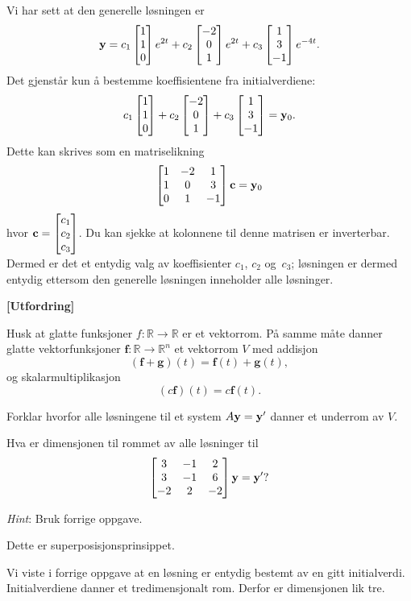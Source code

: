 \begin{losning}
Vi har sett at den generelle løsningen er 
$$\mathbf{y}=c_1\begin{bmatrix} 1 \\ 1 \\ 0 \end{bmatrix}e^{2t}+c_2\begin{bmatrix} -2 \\ 0 \\ 1 \end{bmatrix}e^{2t}+c_3\begin{bmatrix} 1 \\ 3 \\ -1 \end{bmatrix}e^{-4t}.$$ Det gjenstår kun å bestemme koeffisientene fra initialverdiene:
$$c_1\begin{bmatrix} 1 \\ 1 \\ 0 \end{bmatrix}+c_2\begin{bmatrix} -2 \\ 0 \\ 1 \end{bmatrix}+c_3\begin{bmatrix} 1 \\ 3 \\ -1 \end{bmatrix}=\mathbf{y}_0.$$ Dette kan skrives som en matriselikning
$$\begin{bmatrix}
1 & -2 & 1\\
1 & 0 & 3\\
0 & 1 & -1
\end{bmatrix} \mathbf{c}= \mathbf{y}_0$$ hvor $\mathbf{c}=\begin{bmatrix} c_1 \\ c_2 \\ c_3 \end{bmatrix}$. Du kan sjekke at kolonnene til denne matrisen er inverterbar. Dermed er det et entydig valg av koeffisienter $c_1$, $c_2$ og~$c_3$; løsningen er dermed entydig ettersom den generelle løsningen inneholder alle løsninger.
\end{losning}

\newpage
\begin{oppgave}\textbf{[Utfordring]}
	
\noindent
Husk at glatte funksjoner $f :\mathbb{R}\rightarrow \mathbb{R}$ er et vektorrom. På samme måte danner glatte vektorfunksjoner $\mathbf f:\mathbb{R}\rightarrow \mathbb{R}^n$ et vektorrom $V$ med addisjon
$$(\mathbf f + \mathbf g)(t)=\mathbf{f}(t)+\mathbf{g}(t),$$ og skalarmultiplikasjon
$$(c \mathbf f )(t)=c\mathbf{f}(t).$$

\begin{punkt}
Forklar hvorfor alle løsningene til et system $A\mathbf{y}=\mathbf{y}'$ danner et underrom av $V$.
\end{punkt}

\begin{punkt}
Hva er dimensjonen til rommet av alle løsninger til $$
\begin{bmatrix}
3 & -1 & 2\\
3 & -1 & 6\\
-2 & 2 & -2
\end{bmatrix} \mathbf{y}= \mathbf{y} ' ?$$

\noindent
\emph{Hint}: Bruk forrige oppgave.
\end{punkt}


\end{oppgave}





\begin{losning}
	\begin{punkt}
		Dette er superposisjonsprinsippet.
	\end{punkt}
	
	\begin{punkt}
	Vi viste i forrige oppgave at en løsning er entydig bestemt av en gitt initialverdi. Initialverdiene danner et tredimensjonalt rom. Derfor er dimensjonen lik tre.
	\end{punkt}
	
	
\end{losning}










